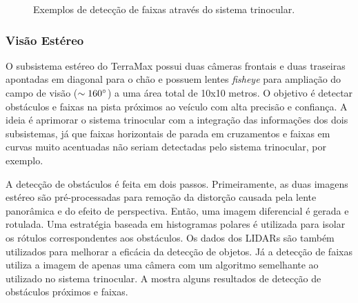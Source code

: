 \begin{figure}[h]
\centering
{}\quad
{}
\caption{Exemplos de detecção de faixas através do sistema trinocular.}%
\label{fig:trinocular_lane}%
\end{figure}


\subsubsection{Visão Estéreo}

O subsistema estéreo do TerraMax possui duas câmeras frontais e duas traseiras apontadas em diagonal para o chão e possuem lentes \emph{fisheye} para ampliação do campo de visão ($\sim160^{\circ}$) a uma área total de 10x10 metros. O objetivo é detectar obstáculos e faixas na pista próximos ao veículo com alta precisão e confiança. A ideia é aprimorar o sistema trinocular com a integração das informações dos dois subsistemas, já que faixas horizontais de parada em cruzamentos e faixas em curvas muito acentuadas não seriam detectadas pelo sistema trinocular, por exemplo.

A detecção de obstáculos é feita em dois passos. Primeiramente, as duas imagens estéreo são pré-processadas para remoção da distorção causada pela lente panorâmica e do efeito de perspectiva. Então, uma imagem diferencial é gerada e rotulada. Uma estratégia baseada em histogramas polares é utilizada para isolar os rótulos correspondentes aos obstáculos. Os dados dos LIDARs são também utilizados para melhorar a eficácia da detecção de objetos. Já a detecção de faixas utiliza a imagem de apenas uma câmera com um algoritmo semelhante ao utilizado no sistema trinocular. A  mostra alguns resultados de detecção de obstáculos próximos e faixas.

